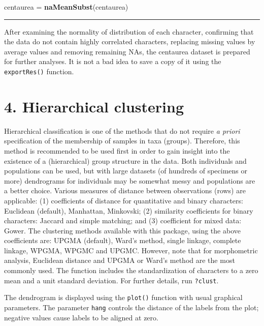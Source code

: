 \documentclass[
]{article}
\newenvironment{Shaded}{\begin{snugshade}}{\end{snugshade}}
\newcommand{\KeywordTok}[1]{\textcolor[rgb]{0.13,0.29,0.53}{\textbf{#1}}}
\newcommand{\NormalTok}[1]{#1}
\newcommand{\StringTok}[1]{\textcolor[rgb]{0.31,0.60,0.02}{#1}}
\begin{document}
\begin{Shaded}
\begin{Highlighting}[]
\NormalTok{centaurea =}\StringTok{ }\KeywordTok{naMeanSubst}\NormalTok{(centaurea)}
\end{Highlighting}
\end{Shaded}

\begin{center}\rule{0.5\linewidth}{\linethickness}\end{center}

After examining the normality of distribution of each character,
confirming that the data do not contain highly correlated characters,
replacing missing values by average values and removing remaining NAs,
the centaurea dataset is prepared for further analyses. It is not a bad
idea to save a copy of it using the \texttt{exportRes()} function.

\newpage

\hypertarget{hierarchical-clustering}{%
\section{4. Hierarchical clustering}\label{hierarchical-clustering}}

Hierarchical classification is one of the methods that do not require
\emph{a priori} specification of the membership of samples in taxa
(groups). Therefore, this method is recommended to be used first in
order to gain insight into the existence of a (hierarchical) group
structure in the data. Both individuals and populations can be used, but
with large datasets (of hundreds of specimens or more) dendrograms for
individuals may be somewhat messy and populations are a better choice.
Various measures of distance between observations (rows) are applicable:
(1) coefficients of distance for quantitative and binary characters:
Euclidean (default), Manhattan, Minkovski; (2) similarity coefficients
for binary characters: Jaccard and simple matching; and (3) coefficient
for mixed data: Gower. The clustering methods available with this
package, using the above coefficients are: UPGMA (default), Ward's
method, single linkage, complete linkage, WPGMA, WPGMC and UPGMC.
However, note that for morphometric analysis, Euclidean distance and
UPGMA or Ward's method are the most commonly used. The function includes
the standardization of characters to a zero mean and a unit standard
deviation. For further details, run \texttt{?clust}.

The dendrogram is displayed using the \texttt{plot()} function with
usual graphical parameters. The parameter \texttt{hang} controls the
distance of the labels from the plot; negative values cause labels to be
aligned at zero.
\end{document}

